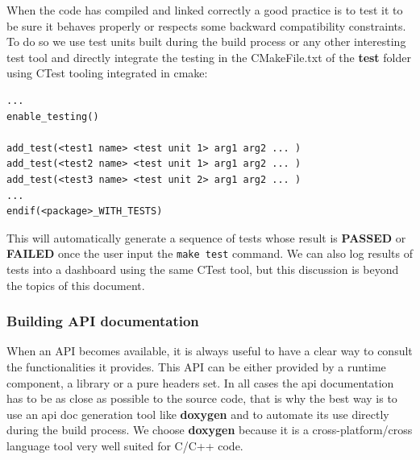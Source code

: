 \documentclass[12pt,a4paper]{article}
\begin{document}
When the code has compiled and linked correctly a good practice is to test it to be sure it behaves properly or respects some backward compatibility constraints. To do so we use test units built during the build process or any other interesting test tool and directly integrate the testing in the CMakeFile.txt of the \textbf{test} folder using CTest tooling integrated in cmake:

\begin{verbatim}
...
enable_testing()

add_test(<test1 name> <test unit 1> arg1 arg2 ... )
add_test(<test2 name> <test unit 1> arg1 arg2 ... )
add_test(<test3 name> <test unit 2> arg1 arg2 ... )
...
endif(<package>_WITH_TESTS)
\end{verbatim}

This will automatically generate a sequence of tests whose result is \textbf{PASSED} or \textbf{FAILED} once the user input the \texttt{make test} command. We can also log results of tests into a dashboard using the same CTest tool, but this discussion is beyond the topics of this document.

\subsubsection{Building API documentation}

When an API becomes available, it is always useful to have a clear way to consult the functionalities it provides. This API can be either provided by a runtime component, a library or a pure headers set. In all cases the api documentation has to be as close as possible to the source code, that is why the best way is to use an api doc generation tool like \textbf{doxygen} and to automate its use directly during the build process. We choose \textbf{doxygen} because it is a cross-platform/cross language tool very well suited for C/C++ code.
\end{document}
